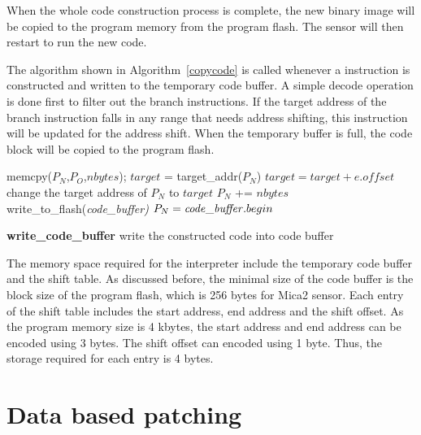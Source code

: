 When the whole code construction process is complete, the new binary image
will be copied to the program memory from the program flash. The sensor will
then restart to run the new code.


The algorithm shown in Algorithm~\ref{copycode} is called whenever a 
instruction is constructed and written to the temporary code buffer.
A simple decode operation is done first to filter out the branch instructions.
If the target address of the branch instruction falls in any range that needs address
shifting, this instruction will be updated for the address shift.
When the temporary buffer is full, the code block will be copied to the
program flash.


\begin{algorithm}
\singlespace
\begin{algorithmic}[1]
\singlespace
{}
\STATE memcpy($P_N$,$P_O$,$nbytes$);
		\STATE $target$ = target\_addr($P_N$)
			\STATE $target = target+e.offset$
			\STATE change the target address of $P_N$ to $target$
		\ENDIF
	\ENDIF	
\ENDFOR
\STATE $P_N$ += $nbytes$
	\STATE write\_to\_flash(\it code\_buffer)
	\STATE $P_N = {{\it code\_buffer}}.begin$
\ENDIF
\end{algorithmic}
\caption{{\bf write\_code\_buffer} \/\/write the constructed code into code buffer}
\label{copycode}
\end{algorithm}

The memory space required for the interpreter include the temporary code buffer
and the shift table. As discussed before, the minimal size of the code buffer is the block
size of the program flash, which is 256 bytes for Mica2 sensor.
Each entry of the shift table includes the start address, end address and the shift offset.
As the program memory size is 4 kbytes, the start address and end address can be
encoded using 3 bytes. The shift offset can encoded using 1 byte. Thus, the storage
required for each entry is 4 bytes.


\section{Data based patching}




